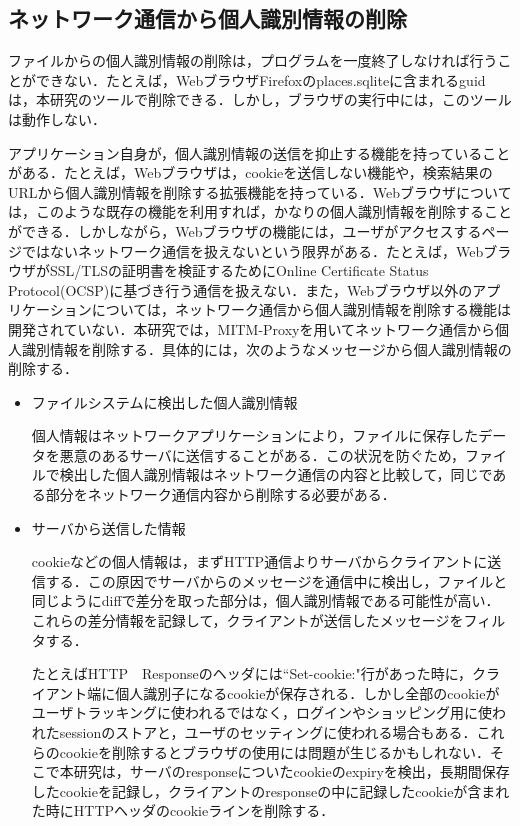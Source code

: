 \documentclass[submit,techrep]{ipsj}
\begin{document}
\begin{itemize}
\begin{itemize}
\end{itemize}



\subsection{ネットワーク通信から個人識別情報の削除}

ファイルからの個人識別情報の削除は，プログラムを一度終了しなければ行うことができない．たとえば，WebブラウザFirefoxのplaces.sqliteに含まれるguidは，本研究のツールで削除できる．しかし，ブラウザの実行中には，このツールは動作しない．

アプリケーション自身が，個人識別情報の送信を抑止する機能を持っていることがある．たとえば，Webブラウザは，cookieを送信しない機能や，検索結果のURLから個人識別情報を削除する拡張機能を持っている．Webブラウザについては，このような既存の機能を利用すれば，かなりの個人識別情報を削除することができる．しかしながら，Webブラウザの機能には，ユーザがアクセスするページではないネットワーク通信を扱えないという限界がある．たとえば，WebブラウザがSSL/TLSの証明書を検証するためにOnline Certificate Status Protocol(OCSP)に基づき行う通信を扱えない．また，Webブラウザ以外のアプリケーションについては，ネットワーク通信から個人識別情報を削除する機能は開発されていない．本研究では，MITM-Proxyを用いてネットワーク通信から個人識別情報を削除する．具体的には，次のようなメッセージから個人識別情報の削除する．
\begin{itemize}

\item
ファイルシステムに検出した個人識別情報

個人情報はネットワークアプリケーションにより，ファイルに保存したデータを悪意のあるサーバに送信することがある．この状況を防ぐため，ファイルで検出した個人識別情報はネットワーク通信の内容と比較して，同じである部分をネットワーク通信内容から削除する必要がある．


\item
サーバから送信した情報

cookieなどの個人情報は，まずHTTP通信よりサーバからクライアントに送信する．この原因でサーバからのメッセージを通信中に検出し，ファイルと同じようにdiffで差分を取った部分は，個人識別情報である可能性が高い．これらの差分情報を記録して，クライアントが送信したメッセージをフィルタする．

たとえばHTTP　Responseのヘッダには``Set-cookie:"行があった時に，クライアント端に個人識別子になるcookieが保存される．しかし全部のcookieがユーザトラッキングに使われるではなく，ログインやショッピング用に使われたsessionのストアと，ユーザのセッティングに使われる場合もある．これらのcookieを削除するとブラウザの使用には問題が生じるかもしれない．そこで本研究は，サーバのresponseについたcookieのexpiryを検出，長期間保存したcookieを記録し，クライアントのresponseの中に記録したcookieが含まれた時にHTTPヘッダのcookieラインを削除する．


\end{itemize}
\end{itemize}
\end{document}
